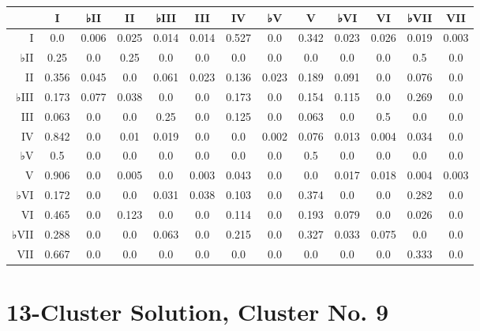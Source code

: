 \begin{table}[htbp]
\begin{minipage}{\linewidth}
\setlength{\tymax}{0.5\linewidth}
\centering
\small
\begin{tabulary}{\textwidth}{@{}RCCCCCCCCCCCC@{}} \toprule
&I&♭II&II&♭III&III&IV&♭V&V&♭VI&VI&♭VII&VII\\
\midrule
I&0.0&0.006&0.025&0.014&0.014&0.527&0.0&0.342&0.023&0.026&0.019&0.003\\
♭II&0.25&0.0&0.25&0.0&0.0&0.0&0.0&0.0&0.0&0.0&0.5&0.0\\
II&0.356&0.045&0.0&0.061&0.023&0.136&0.023&0.189&0.091&0.0&0.076&0.0\\
♭III&0.173&0.077&0.038&0.0&0.0&0.173&0.0&0.154&0.115&0.0&0.269&0.0\\
III&0.063&0.0&0.0&0.25&0.0&0.125&0.0&0.063&0.0&0.5&0.0&0.0\\
IV&0.842&0.0&0.01&0.019&0.0&0.0&0.002&0.076&0.013&0.004&0.034&0.0\\
♭V&0.5&0.0&0.0&0.0&0.0&0.0&0.0&0.5&0.0&0.0&0.0&0.0\\
V&0.906&0.0&0.005&0.0&0.003&0.043&0.0&0.0&0.017&0.018&0.004&0.003\\
♭VI&0.172&0.0&0.0&0.031&0.038&0.103&0.0&0.374&0.0&0.0&0.282&0.0\\
VI&0.465&0.0&0.123&0.0&0.0&0.114&0.0&0.193&0.079&0.0&0.026&0.0\\
♭VII&0.288&0.0&0.0&0.063&0.0&0.215&0.0&0.327&0.033&0.075&0.0&0.0\\
VII&0.667&0.0&0.0&0.0&0.0&0.0&0.0&0.0&0.0&0.0&0.333&0.0\\

\bottomrule

\end{tabulary}
\end{minipage}
\end{table}

\section{13-Cluster Solution, Cluster No. 9}
\label{13-clustersolutionclusterno.9}

